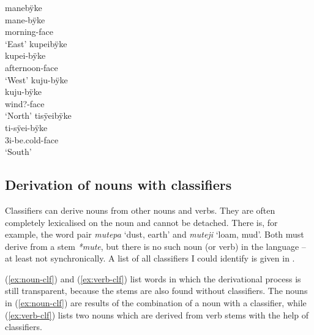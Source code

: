 \ea\label{ex:cardinals}
  \ea\label{ex:cardinals.1}
\begingl
\glpreamble manebÿke\\
\gla mane-bÿke\\
\glb morning-face\\
\glft ‘East’
\endgl
  \ex\label{ex:cardinals.2}
\begingl
\glpreamble kupeibÿke\\
\gla kupei-bÿke\\
\glb afternoon-face\\
\glft ‘West’
\endgl
  \ex\label{ex:cardinals.3}
\begingl
\glpreamble kuju-bÿke\\
\gla kuju-bÿke\\
\glb wind?-face\\
\glft ‘North’
\endgl
  \ex\label{ex:cardinals.4}
\begingl
\glpreamble tisÿeibÿke\\
\gla ti-sÿei-bÿke\\
\glb 3i-be.cold-face\\
\glft ‘South’
\endgl
\z
\xe
{}

\subsection{Derivation of nouns with classifiers}\label{sec:Nouns_CLF}

Classifiers can derive nouns from other nouns and verbs. They are often completely lexicalised on the noun and cannot be detached. There is, for example, the word pair \textit{mutepa} ‘dust, earth’ and \textit{muteji} ‘loam, mud’. Both must derive from a stem \textit{*mute}, but there is no such noun (or verb) in the language – at least not synchronically. A list of all classifiers I could identify is given in .

(\ref{ex:noun-clf}) and (\ref{ex:verb-clf}) list words in which the derivational process is still transparent, because the stems are also found without classifiers. The nouns in (\ref{ex:noun-clf}) are results of the combination of a noun with a classifier, while (\ref{ex:verb-clf}) lists two nouns which are derived from verb stems with the help of classifiers.


